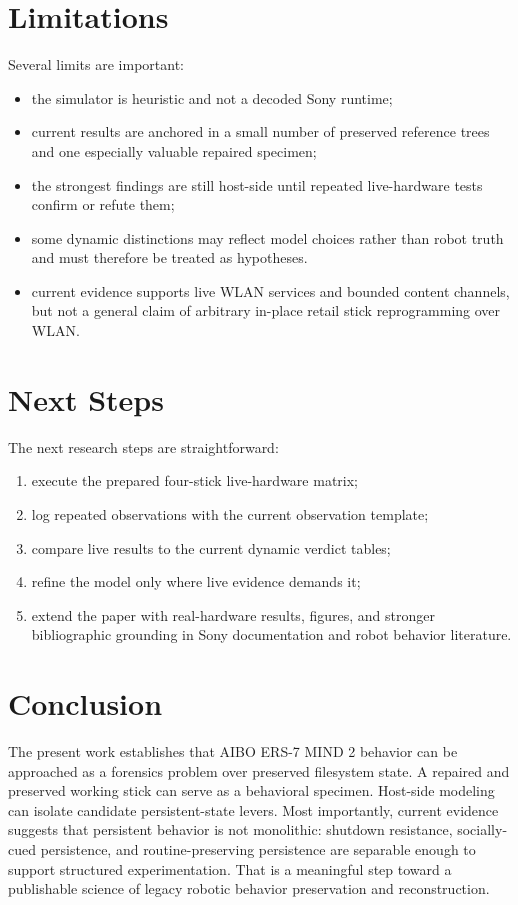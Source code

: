 \documentclass[11pt]{article}
\begin{document}
\section{Limitations}
Several limits are important:
\begin{itemize}[leftmargin=*]
\item the simulator is heuristic and not a decoded Sony runtime;
\item current results are anchored in a small number of preserved reference
trees and one especially valuable repaired specimen;
\item the strongest findings are still host-side until repeated live-hardware
tests confirm or refute them;
\item some dynamic distinctions may reflect model choices rather than robot
truth and must therefore be treated as hypotheses.
\item current evidence supports live WLAN services and bounded content channels,
but not a general claim of arbitrary in-place retail stick reprogramming over
WLAN.
\end{itemize}

\section{Next Steps}
The next research steps are straightforward:
\begin{enumerate}[leftmargin=*]
\item execute the prepared four-stick live-hardware matrix;
\item log repeated observations with the current observation template;
\item compare live results to the current dynamic verdict tables;
\item refine the model only where live evidence demands it;
\item extend the paper with real-hardware results, figures, and stronger
bibliographic grounding in Sony documentation and robot behavior literature.
\end{enumerate}

\section{Conclusion}
The present work establishes that AIBO ERS-7 MIND 2 behavior can be approached
as a forensics problem over preserved filesystem state. A repaired and
preserved working stick can serve as a behavioral specimen. Host-side modeling
can isolate candidate persistent-state levers. Most importantly, current
evidence suggests that persistent behavior is not monolithic: shutdown
resistance, socially-cued persistence, and routine-preserving persistence are
separable enough to support structured experimentation. That is a meaningful
step toward a publishable science of legacy robotic behavior preservation and
reconstruction.
\end{document}
